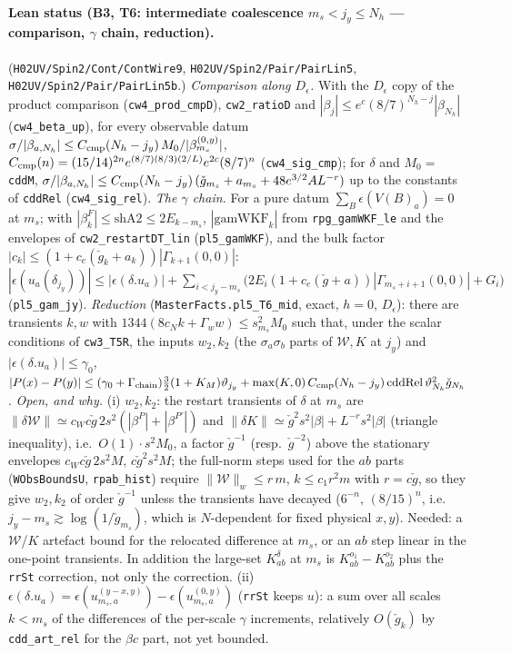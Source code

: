 \documentclass[11pt]{amsart}
\theoremstyle{definition}
\theoremstyle{remark}
\numberwithin{equation}{section}
\begin{document}
\paragraph{Lean status (B3, T6: intermediate coalescence $m_s<j_y\le N_h$ --- comparison, $\gamma$ chain, reduction).}
(\texttt{H02UV/Spin2/Cont/ContWire9}, \texttt{H02UV/Spin2/Pair/PairLin5}, \texttt{H02UV/Spin2/Pair/PairLin5b}.) \emph{Comparison along $D_\epsilon$.}
With the $D_\epsilon$ copy of the product comparison (\texttt{cw4\_prod\_cmpD}), \texttt{cw2\_ratioD} and
$|\beta_j|\le e^{c}(8/7)^{N_h-j}|\beta_{N_h}|$ (\texttt{cw4\_beta\_up}), for every observable datum
$\sigma/|\beta_{a,N_h}|\le C_{\rm cmp}(N_h-j_y)\,M_0/|\beta^{(0,y)}_{m_s}|$,
$C_{\rm cmp}(n)=(15/14)^{2n}e^{(8/7)(8/3)(2/L)}e^{2c}(8/7)^n$ (\texttt{cw4\_sig\_cmp}); for $\delta$ and $M_0=$\texttt{cddM},
$\sigma/|\beta_{a,N_h}|\le C_{\rm cmp}(N_h-j_y)\,(\check g_{m_s}+a_{m_s}+48e^{3/2}AL^{-r})$ up to the constants of
\texttt{cddRel} (\texttt{cw4\_sig\_rel}). \emph{The $\gamma$ chain.} For a pure datum $\sum_B\epsilon(V(B)_a)=0$ at $m_s$;
with $|\beta^F_k|\le\mathrm{shA2}\le2E_{k-m_s}$, $|\mathrm{gamWKF}_k|$ from \texttt{rpg\_gamWKF\_le} and the envelopes of
\texttt{cw2\_restartDT\_lin} (\texttt{pl5\_gamWKF}), and the bulk factor $|c_k|\le(1+c_e(\check g_k+a_k))|\Gamma_{k+1}(0,0)|$:
$|\epsilon(u_a(\delta_{j_y}))|\le|\epsilon(\delta.u_a)|+\sum_{i<j_y-m_s}\bigl(2E_i(1+c_e(\check g+a))|\Gamma_{m_s+i+1}(0,0)|
+G_i\bigr)$ (\texttt{pl5\_gam\_jy}). \emph{Reduction} (\texttt{MasterFacts.pl5\_T6\_mid}, exact, $h=0$, $D_\epsilon$): there
are transients $k,w$ with $1344(8c_Nk+\Gamma_ww)\le s_{m_s}^2M_0$ such that, under the scalar conditions of
\texttt{cw3\_T5R}, the inputs $w_2,k_2$ (the $\sigma_a\sigma_b$ parts of $\mathcal W,K$ at $j_y$) and
$|\epsilon(\delta.u_a)|\le\gamma_0$,
$|P(x)-P(y)|\le(\gamma_0+\Gamma_{\rm chain})\tfrac32(1+K_M)\vartheta_{j_y}
+\max(K,0)\,C_{\rm cmp}(N_h-j_y)\,\mathrm{cddRel}\,\vartheta_{N_h}^2\check g_{N_h}$.
\emph{Open, and why.} (i) $w_2,k_2$: the restart transients of $\delta$ at $m_s$ are $\|\delta\mathcal W\|\simeq c_W c\check g\,
2s^2(|\beta^P|+|\beta^{P'}|)$ and $\|\delta K\|\simeq\check g^2s^2|\beta|+L^{-r}s^2|\beta|$ (triangle inequality), i.e.\
$O(1)\cdot s^2M_0$, a factor $\check g^{-1}$ (resp.\ $\check g^{-2}$) above the stationary envelopes $c_Wc\check g\,2s^2M$,
$c\check g^2s^2M$; the full-norm steps used for the $ab$ parts (\texttt{WObsBoundsU}, \texttt{rpab\_hist}) require
$\|\mathcal W\|_w\le r\,m$, $k\le c_1r^2m$ with $r=c\check g$, so they give $w_2,k_2$ of order $\check g^{-1}$ unless the
transients have decayed ($6^{-n}$, $(8/15)^n$, i.e.\ $j_y-m_s\gtrsim\log(1/\check g_{m_s})$, which is $N$-dependent for fixed
physical $x,y$). Needed: a $\mathcal W$/$K$ artefact bound for the relocated difference at $m_s$, or an $ab$ step linear in
the one-point transients. In addition the large-set $K^\delta_{ab}$ at $m_s$ is $K^{o_1}_{ab}-K^{o_2}_{ab}$ plus the
\texttt{rrSt} correction, not only the correction. (ii) $\epsilon(\delta.u_a)=\epsilon(u^{(y-x,y)}_{m_s,a})-
\epsilon(u^{(0,y)}_{m_s,a})$ (\texttt{rrSt} keeps $u$): a sum over all scales $k<m_s$ of the differences of the per-scale
$\gamma$ increments, relatively $O(\check g_k)$ by \texttt{cdd\_art\_rel} for the $\beta c$ part, not yet bounded.
\end{document}
